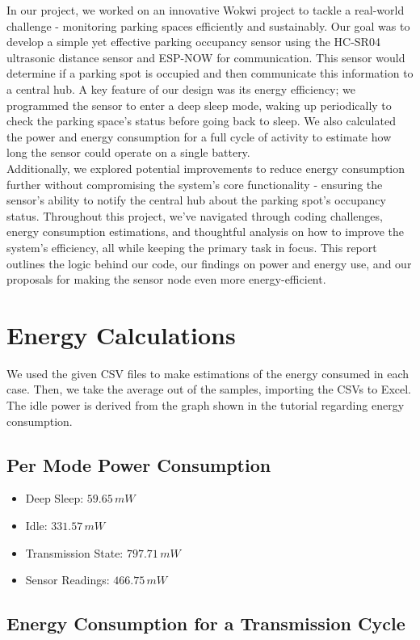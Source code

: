 \documentclass{article}
\begin{document}
In our project, we worked on an innovative Wokwi project to tackle a real-world challenge - monitoring parking spaces efficiently and sustainably. Our goal was to develop a simple yet effective parking occupancy sensor using the HC-SR04 ultrasonic distance sensor and ESP-NOW for communication. This sensor would determine if a parking spot is occupied and then communicate this information to a central hub. A key feature of our design was its energy efficiency; we programmed the sensor to enter a deep sleep mode, waking up periodically to check the parking space's status before going back to sleep. We also calculated the power and energy consumption for a full cycle of activity to estimate how long the sensor could operate on a single battery. \\Additionally, we explored potential improvements to reduce energy consumption further without compromising the system's core functionality - ensuring the
sensor's ability to notify the central hub about the parking spot's occupancy status. Throughout this project, we've navigated through coding challenges, energy consumption estimations, and thoughtful analysis on how to improve the system's efficiency, all while keeping the primary task in focus. This report outlines the logic behind our code, our findings on power and energy use, and our proposals for making the sensor node even more energy-efficient. 

\section{Energy Calculations}

We used the given CSV files to make estimations of the energy consumed in each case. Then, we take the average out of the samples, importing the CSVs to Excel. The idle power is derived from the graph shown in the tutorial regarding energy consumption.
\subsection{Per Mode Power Consumption}
\begin{itemize}
    \item Deep Sleep: $59.65\,mW$
    \item Idle: $331.57\,mW$
    \item Transmission State: $797.71\,mW$
    \item Sensor Readings: $466.75\,mW$
\end{itemize}

\subsection{Energy Consumption for a Transmission Cycle}
\end{document}
